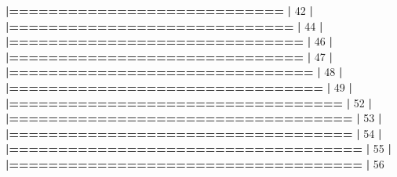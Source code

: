 \documentclass[]{book}
\newenvironment{Shaded}{\begin{snugshade}}{\end{snugshade}}
\newcommand{\DecValTok}[1]{\textcolor[rgb]{0.00,0.00,0.81}{#1}}
\newcommand{\ErrorTok}[1]{\textcolor[rgb]{0.64,0.00,0.00}{\textbf{#1}}}
\newcommand{\NormalTok}[1]{#1}
\newcommand{\OperatorTok}[1]{\textcolor[rgb]{0.81,0.36,0.00}{\textbf{#1}}}
\newcommand{\StringTok}[1]{\textcolor[rgb]{0.31,0.60,0.02}{#1}}
\begin{document}
\begin{Shaded}
\begin{Highlighting}[]
{{{{{{{{{{{{{{{{{{{{{{\StringTok{  }\ErrorTok{|============================}\StringTok{                                     }\ErrorTok{|}\StringTok{  }\DecValTok{42}\NormalTok{%}
  \OperatorTok{|}\StringTok{                                                                       }
\StringTok{  }\ErrorTok{|=============================}\StringTok{                                    }\ErrorTok{|}\StringTok{  }\DecValTok{44}\NormalTok{%}
  \OperatorTok{|}\StringTok{                                                                       }
\StringTok{  }\ErrorTok{|==============================}\StringTok{                                   }\ErrorTok{|}\StringTok{  }\DecValTok{46}\NormalTok{%}
  \OperatorTok{|}\StringTok{                                                                       }
\StringTok{  }\ErrorTok{|==============================}\StringTok{                                   }\ErrorTok{|}\StringTok{  }\DecValTok{47}\NormalTok{%}
  \OperatorTok{|}\StringTok{                                                                       }
\StringTok{  }\ErrorTok{|===============================}\StringTok{                                  }\ErrorTok{|}\StringTok{  }\DecValTok{48}\NormalTok{%}
  \OperatorTok{|}\StringTok{                                                                       }
\StringTok{  }\ErrorTok{|================================}\StringTok{                                 }\ErrorTok{|}\StringTok{  }\DecValTok{49}\NormalTok{%}
  \OperatorTok{|}\StringTok{                                                                       }
\StringTok{  }\ErrorTok{|==================================}\StringTok{                               }\ErrorTok{|}\StringTok{  }\DecValTok{52}\NormalTok{%}
  \OperatorTok{|}\StringTok{                                                                       }
\StringTok{  }\ErrorTok{|===================================}\StringTok{                              }\ErrorTok{|}\StringTok{  }\DecValTok{53}\NormalTok{%}
  \OperatorTok{|}\StringTok{                                                                       }
\StringTok{  }\ErrorTok{|===================================}\StringTok{                              }\ErrorTok{|}\StringTok{  }\DecValTok{54}\NormalTok{%}
  \OperatorTok{|}\StringTok{                                                                       }
\StringTok{  }\ErrorTok{|====================================}\StringTok{                             }\ErrorTok{|}\StringTok{  }\DecValTok{55}\NormalTok{%}
  \OperatorTok{|}\StringTok{                                                                       }
\StringTok{  }\ErrorTok{|====================================}\StringTok{                             }\ErrorTok{|}\StringTok{  }\DecValTok{56}\NormalTok{%}
}}}}}}}}}}}}}}}}}}}}}}}}}}}}}}}}}
\end{Highlighting}
\end{Shaded}
\end{document}
